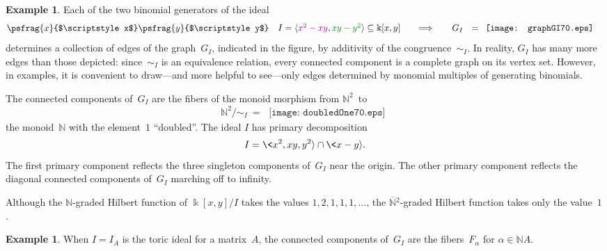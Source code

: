 \documentclass[12pt]{amsart}
\numberwithin{equation}{section}
\theoremstyle{definition}
\newtheorem{example}[thm]{Example}
\begin{document}
\begin{example}\label{e:graph}
Each of the two binomial generators of the ideal
$$\psfrag{x}{$\scriptstyle x$}
\psfrag{y}{$\scriptstyle y$}
\begin{array}{cc}
  \begin{array}{c}
  I = {\langle}{\color{darkpurple}x^2-xy}, {\color{darkgreen}xy-y^2}{\rangle}
  \subseteq {\Bbbk}[x,y]
  \qquad{\Longrightarrow}\ \
  \end{array}
&
  G_I\ \ = \begin{array}{c}\texttt{[image: graphGI70.eps]}\end{array}
\end{array}
$$determines a collection of edges of the graph~$G_I$, indicated in the
figure, by additivity of the congruence~${\mathord\sim}_I$.  In reality, $G_I$
has many more edges than those depicted: since~${\mathord\sim}_I$ is an
equivalence relation, every connected component is a complete graph on
its vertex set.  However, in examples, it is convenient to draw---and
more helpful to see---only edges determined by monomial multiples of
generating binomials.

The connected components of~$G_I$ are the fibers of the monoid
morphism from ${\mathbb{N}}^2$~to
$$  {\mathbb{N}}^2/{\mathord\sim}_I\ =\ \begin{array}{c}\texttt{[image: doubledOne70.eps]}\end{array}
$$
the monoid~${\mathbb{N}}$ with the element~$1$ ``doubled''.  The ideal $I$ has
primary decomposition
$$  I = \<x^2, xy, y^2{\rangle} \cap \<x - y{\rangle}.
$$
The first primary component reflects the three singleton components
of~$G_I$ near the origin.  The other primary component reflects the
diagonal connected components of~$G_I$ marching off to infinity.

Although the ${\mathbb{N}}$-graded Hilbert function of ${\Bbbk}[x,y]/I$ takes the
values $1,2,1,1,1,\ldots$, the ${{\overline{{\mathbb{N}}}}{}}{}^2$-graded Hilbert function
takes only the value~$1$.
\end{example}

\begin{example}
When $I = I_A$ is the toric ideal for a matrix~$A$, the connected
components of~$G_I$ are the fibers~$F_\alpha$ for $\alpha \in {\mathbb{N}} A$.
\end{example}
\end{document}

